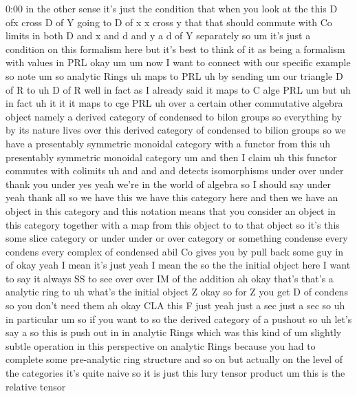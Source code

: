 \begin{unfinished}{0:00}
in  the  other  sense  it's  just  the
condition  that  when  you  look  at  the  this
D  ofx  cross  D  of  Y  going  to  D  of  x  x
cross  y  that  that  should  commute  with  Co
limits  in  both  D  and  x  and  d  and  y  a  d
of  Y  separately
so  um  it's  just  a  condition  on  this
formalism  here  but  it's  best  to  think  of
it  as  being  a  formalism  with  values  in
PRL  okay
um  um  now  I  want  to  connect  with  our
specific  example  so
note  um
so  analytic
Rings  uh  maps  to
PRL  uh  by  sending
um  our  triangle  D  of
R  to  uh  D  of  R  well  in  fact  as  I  already
said  it  maps  to  C  alge
PRL
um  but  uh  in  fact
uh
it  it  it  maps  to  cge  PRL  uh  over  a
certain  other  commutative  algebra  object
namely  a  derived  category  of  condensed
to  bilon  groups  so  everything  by  by  its
nature  lives  over  this  derived  category
of  condensed  to  bilion  groups  so  we  have
a  presentably  symmetric  monoidal
category  with  a  functor
from  this  uh  presentably  symmetric
monoidal
category  um  and  then  I  claim
uh  this
functor  commutes  with
colimits  uh  and  and  and  detects
isomorphisms  under  over  under  thank  you
under  yes  yeah  we're  in  the  world  of
algebra  so  I  should  say  under  yeah  thank
all  so  we  have  this  we  have  this
category  here  and  then  we  have  an  object
in  this  category  and  this  notation  means
that  you  consider  an  object  in  this
category  together  with  a  map  from  this
object  to  to  that  object  so  it's  this
some  slice  category  or  under  under  or
over  category  or
something  condense  every  condens  every
complex  of  condensed  abil
Co  gives  you  by  pull  back  some  guy  in  of
okay  yeah  I  mean  it's
just  yeah  I  mean  the  so
the  the  initial  object
here  I  want  to
say  it  always  SS
to  see  over  over  IM  of  the  addition  ah
okay  that's  that's  a  analytic
ring
to
uh  what's  the  initial  object  Z  okay  so
for  Z  you  get  D  of
condens  so  you  don't  need  them  ah  okay
CLA  this
F  just  yeah  just  a  sec  just  a  sec  so
uh  in
particular  um  so  if  you  want  to  so  the
derived  category  of  a  pushout  so  uh
let's  say
a  so  this  is  push  out
in  in  analytic
Rings  which  was  this  kind  of  um  slightly
subtle  operation  in  this  perspective  on
analytic  Rings  because  you  had  to
complete  some  pre-analytic  ring
structure  and  so  on  but  actually  on  the
level  of  the  categories  it's  quite  naive
so  it  is  just  this  lury  tensor
product
um  this  is  the  relative  tensor

\end{unfinished}
